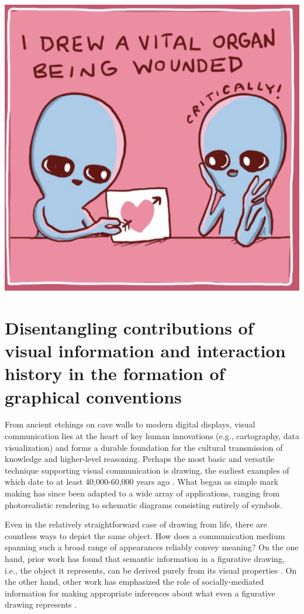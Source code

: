 
\begin{savequote}[75mm]
\includegraphics[width=0.75\linewidth]{./figures/graphical/comic.png}
\end{savequote}

\chapter{Disentangling contributions of visual information and interaction history in the formation of graphical conventions}
\graphicspath{{./figures/graphical/}}

From ancient etchings on cave walls to modern digital displays, visual communication lies at the heart of key human innovations (e.g., cartography, data visualization) and forms a durable foundation for the cultural transmission of knowledge and higher-level reasoning.
Perhaps the most basic and versatile technique supporting visual communication is drawing, the earliest examples of which date to at least 40,000-60,000 years ago \cite{hoffmann2018u}.
What began as simple mark making has since been adapted to a wide array of applications, ranging from photorealistic rendering to schematic diagrams consisting entirely of symbols.

Even in the relatively straightforward case of drawing from life, there are countless ways to depict the same object.
How does a communication medium spanning such a broad range of appearances reliably convey meaning?
On the one hand, prior work has found that semantic information in a figurative drawing, i.e., the object it represents, can be derived purely from its visual properties \cite{FanCommon2018}.
On the other hand, other work has emphasized the role of socially-mediated information for making appropriate inferences about what even a figurative drawing represents \cite{goodman1976languages}.

